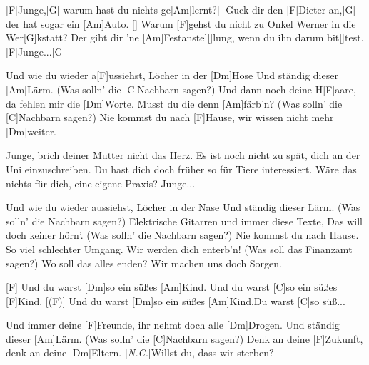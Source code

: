 

\hfill{}

\begin{guitar}
	[F]Junge,[G] warum hast du nichts ge[Am]lernt?[]{}
	Guck dir den [F]Dieter an,[G] der hat sogar ein [Am]Auto. []{}
	Warum [F]gehst du nicht zu Onkel Werner in die Wer[G]kstatt?
	Der gibt dir 'ne [Am]Festanstel[]lung, wenn du ihn darum bit[]test.
	[F]Junge...[G]{}
	
	\begin{highlightbar}
		Und wie du wieder a[F]ussiehst, Löcher in der [Dm]Hose
		Und ständig dieser [Am]Lärm. (Was solln' die [C]Nachbarn sagen?)
		Und dann noch deine H[F]aare, da fehlen mir die [Dm]Worte.
		Musst du die denn [Am]färb'n? (Was solln' die [C]Nachbarn sagen?)
		Nie kommst du nach [F]Hause, wir wissen nicht mehr [Dm]weiter.
	\end{highlightbar}
	
	\songsection{Strophe 2}
	Junge, brich deiner Mutter nicht das Herz.
	Es ist noch nicht zu spät, dich an der Uni einzuschreiben.
	Du hast dich doch früher so für Tiere interessiert.
	Wäre das nichts für dich, eine eigene Praxis?
	Junge...
	
	\begin{highlightbar}
		\songsection{Refrain 2}
		Und wie du wieder aussiehst, Löcher in der Nase
		Und ständig dieser Lärm. (Was solln' die Nachbarn sagen?)
		Elektrische Gitarren und immer diese Texte,
		Das will doch keiner hörn'. (Was solln' die Nachbarn sagen?)
		Nie kommst du nach Hause. So viel schlechter Umgang.
		Wir werden dich enterb'n! (Was soll das Finanzamt sagen?)
		Wo soll das alles enden? Wir machen uns doch Sorgen.
	\end{highlightbar}
	
	\songsection{Bridge}
	[F] Und du warst [Dm]so ein süßes [Am]Kind. Und du warst [C]so ein süßes [F]Kind.
	[(F)] Und du warst [Dm]so ein süßes [Am]Kind.Du warst [C]so süß...
	
	\begin{highlightbar}
		\songsection{Refrain 3}
		Und immer deine [F]Freunde, ihr nehmt doch alle [Dm]Drogen.
		Und ständig dieser [Am]Lärm. (Was solln' die [C]Nachbarn sagen?)
		Denk an deine [F]Zukunft, denk an deine [Dm]Eltern.
		[\textit{N.C.}]Willst du, dass wir sterben? 
	\end{highlightbar}
\end{guitar}